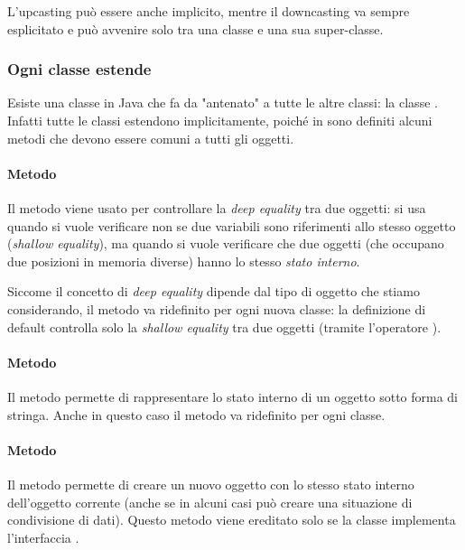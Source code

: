 L'upcasting può essere anche implicito, mentre il downcasting va sempre esplicitato e può avvenire solo tra una classe e una sua super-classe.

\subsubsection{Ogni classe estende }

Esiste una classe in Java che fa da "antenato" a tutte le altre classi: la classe . Infatti tutte le classi estendono  implicitamente, poiché in  sono definiti alcuni metodi che devono essere comuni a tutti gli oggetti.

\paragraph{Metodo } Il metodo  viene usato per controllare la \emph{deep equality} tra due oggetti: si usa  quando si vuole verificare non se due variabili sono riferimenti allo stesso oggetto (\emph{shallow equality}), ma quando si vuole verificare che due oggetti (che occupano due posizioni in memoria diverse) hanno lo stesso \emph{stato interno}.

Siccome il concetto di \emph{deep equality} dipende dal tipo di oggetto che stiamo considerando, il metodo  va ridefinito per ogni nuova classe: la definizione di default controlla solo la \emph{shallow equality} tra due oggetti (tramite l'operatore \InlineJava{==}).

\paragraph{Metodo } Il metodo  permette di rappresentare lo stato interno di un oggetto sotto forma di stringa. Anche in questo caso il metodo va ridefinito per ogni classe.

\paragraph{Metodo } Il metodo  permette di creare un nuovo oggetto con lo stesso stato interno dell'oggetto corrente (anche se in alcuni casi può creare una situazione di condivisione di dati). Questo metodo viene ereditato solo se la classe implementa l'interfaccia .

